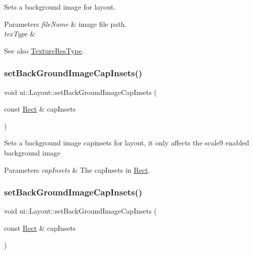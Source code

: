 Sets a background image for layout.


\begin{DoxyParams}{Parameters}
{\em file\+Name} & image file path. \\
\hline
{\em tex\+Type} & \\
\hline
\end{DoxyParams}
\begin{DoxySeeAlso}{See also}
\hyperlink{classui_1_1Widget_a040a65ec5ad3b11119b7e16b98bd9af0}{Texture\+Res\+Type}. 
\end{DoxySeeAlso}
\mbox{\label{classui_1_1Layout_ab9eec8cd5da18065215b502bce86d2dd}} 
\subsubsection{\texorpdfstring{set\+Back\+Ground\+Image\+Cap\+Insets()}{setBackGroundImageCapInsets()}\hspace{0.1cm}{\footnotesize\ttfamily [1/2]}}
{\footnotesize\ttfamily void ui\+::\+Layout\+::set\+Back\+Ground\+Image\+Cap\+Insets (\begin{DoxyParamCaption}\item[{const \hyperlink{classRect}{Rect} \&}]{cap\+Insets }\end{DoxyParamCaption})}

Sets a background image capinsets for layout, it only affects the scale9 enabled background image


\begin{DoxyParams}{Parameters}
{\em cap\+Insets} & The cap\+Insets in \hyperlink{classRect}{Rect}. \\
\hline
\end{DoxyParams}
\mbox{\label{classui_1_1Layout_ab9eec8cd5da18065215b502bce86d2dd}} 
\subsubsection{\texorpdfstring{set\+Back\+Ground\+Image\+Cap\+Insets()}{setBackGroundImageCapInsets()}\hspace{0.1cm}{\footnotesize\ttfamily [2/2]}}
{\footnotesize\ttfamily void ui\+::\+Layout\+::set\+Back\+Ground\+Image\+Cap\+Insets (\begin{DoxyParamCaption}\item[{const \hyperlink{classRect}{Rect} \&}]{cap\+Insets }\end{DoxyParamCaption})}

